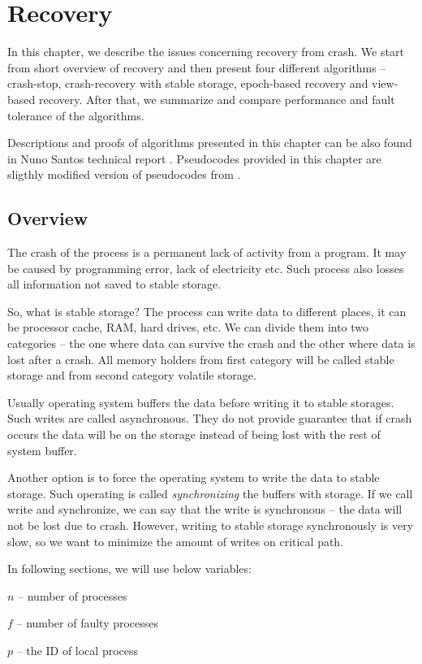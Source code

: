 \chapter{Recovery}
\label{chapter:recovery}

In this chapter, we describe the issues concerning recovery from crash. We start from short overview of recovery and then present four different algorithms -- crash-stop, crash-recovery with stable storage, epoch-based recovery and view-based recovery. \linebreak After that, we summarize and compare performance and fault tolerance of the algorithms. 

Descriptions and proofs of algorithms presented in this chapter can be also found in Nuno Santos technical report \cite{Nun10}. Pseudocodes provided in this chapter are sligthly modified version of pseudocodes from \cite{Nun10}.

\section{Overview}

The crash of the process is a permanent lack of activity from a program. It may be caused by programming error, lack of electricity etc. Such process also losses all information not saved to stable storage.

So, what is stable storage? The process can write data to different places, it can be processor cache, RAM, hard drives, etc. We can divide them into two categories -- the one where data can survive the crash and the other where data is lost after a crash. All memory holders from first category will be called stable storage and from second category volatile storage.

Usually operating system buffers the data before writing it to stable storages. Such writes are called asynchronous. They do not provide guarantee that if crash occurs the data will be on the storage instead of being lost with the rest of system buffer.

Another option is to force the operating system to write the data to stable storage. Such operating is called \emph{synchronizing} the buffers with storage. If we call write and synchronize, we can say that the write is synchronous -- the data will not be lost due to crash. However, writing to stable storage synchronously is very slow, so we want to minimize the amount of writes on critical path.

In following sections, we will use below variables: 
\begin{tightList}
  \item[$n$] -- number of processes
  \item[$f$] -- number of faulty processes
  \item[$p$] -- the ID of local process
\end{tightList}

